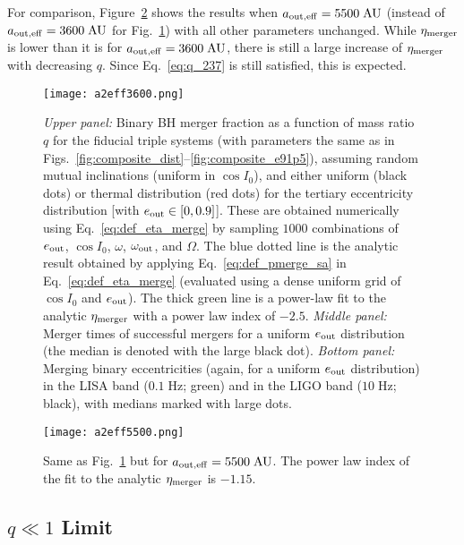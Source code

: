 \documentclass[
        fleqn,
        usenatbib,
    ]{mnras}
\begin{document}
For comparison, Figure~\ref{fig:popsynth5500} shows the results when
$a_{\rm out, eff} = 5500\;\mathrm{AU}$ (instead of $a_{\rm out, eff} =
3600\;\mathrm{AU}$ for Fig.~\ref{fig:popsynth}) with all other parameters
unchanged. While $\eta_{\rm merger}$ is lower than it is for $a_{\rm out, eff} =
3600\;\mathrm{AU}$, there is still a large increase of $\eta_{\rm merger}$ with
decreasing $q$. Since Eq.~\eqref{eq:q_237} is still satisfied, this is expected.
\begin{figure}
    \centering
    \texttt{[image: a2eff3600.png]}
    \caption{\emph{Upper panel:} Binary BH merger fraction as a function of mass
    ratio $q$ for the fiducial triple systems (with parameters the same as in
    Figs.~\ref{fig:composite_dist}--\ref{fig:composite_e91p5}), assuming random
    mutual inclinations (uniform in $\cos I_0$), and either uniform (black dots)
    or thermal distribution (red dots) for the tertiary eccentricity
    distribution [with $e_{\rm out} \in [0,0.9]$]. These are obtained
    numerically using Eq.~\eqref{eq:def_eta_merge} by sampling $1000$
    combinations of $e_{\rm out}$, $\cos I_0$, $\omega$, $\omega_{\rm out}$, and
    $\Omega$. The blue dotted line is the analytic result obtained by applying
    Eq.~\eqref{eq:def_pmerge_sa} in Eq.~\eqref{eq:def_eta_merge} (evaluated
    using a dense uniform grid of $\cos I_0$ and $e_{\rm out}$).
    The thick green line is a power-law fit to the analytic
    $\eta_{\rm merger}$ with a power law index of $-2.5$. \emph{Middle panel:}
    Merger times of successful mergers for a uniform $e_{\rm out}$ distribution
    (the median is denoted with the large black dot). \emph{Bottom panel:}
    Merging binary eccentricities (again, for a uniform $e_{\rm out}$
    distribution) in the LISA band ($0.1\;\mathrm{Hz}$; green) and in the LIGO
    band ($10 \;\mathrm{Hz}$; black), with medians marked with large dots.
    }\label{fig:popsynth}
\end{figure}
\begin{figure}
    \centering
    \texttt{[image: a2eff5500.png]}
    \caption{Same as Fig.~\ref{fig:popsynth} but for $a_{\rm out, eff} =
    5500\;\mathrm{AU}$. The power law index of the fit to the
    analytic $\eta_{\rm merger}$ is $-1.15$. }\label{fig:popsynth5500}
\end{figure}

\subsection{$q \ll 1$ Limit}
\end{document}
